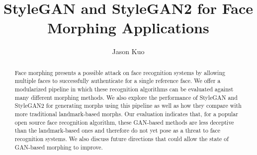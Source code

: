 \documentclass[12pt,twocolumn]{paper}
\begin{document}
\title{StyleGAN and StyleGAN2 for Face Morphing Applications}
\author{Jason Kuo}
\maketitle

\begin{abstract}
    Face morphing presents a possible attack on face recognition systems by allowing multiple faces to successfully authenticate for a single reference face. We offer a modularized pipeline in which these recognition algorithms can be evaluated against many different morphing methods. We also explore the performance of StyleGAN and StyleGAN2 for generating morphs using this pipeline as well as how they compare with more traditional landmark-based morphs. Our evaluation indicates that, for a popular open source face recognition algorithm, these GAN-based methods are less deceptive than the landmark-based ones and therefore do not yet pose as a threat to face recognition systems. We also discuss future directions that could allow the state of GAN-based morphing to improve.
\end{abstract}
\end{document}
